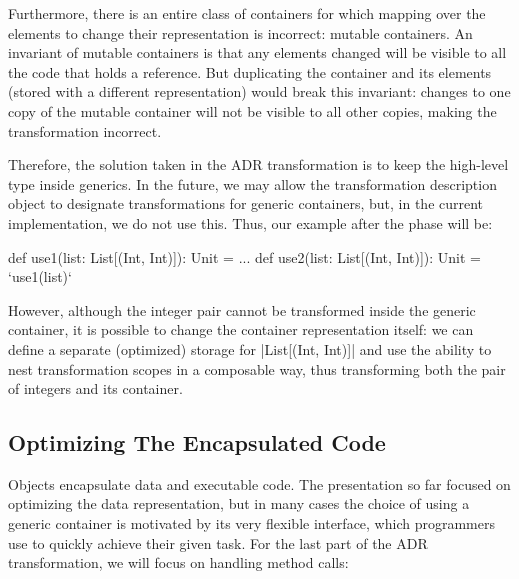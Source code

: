 Furthermore, there is an entire class of containers for which mapping over the elements to change their representation is incorrect: mutable containers. An invariant of mutable containers is that any elements changed will be visible to all the code that holds a reference. But duplicating the container and its elements (stored with a different representation) would break this invariant: changes to one copy of the mutable container will not be visible to all other copies, making the transformation incorrect.

Therefore, the solution taken in the ADR transformation is to keep the high-level type inside generics. In the future, we may allow the transformation description object to designate transformations for generic containers, but, in the current implementation, we do not use this. Thus, our example after the \commit{} phase will be:

\begin{lstlisting-nobreak}
def use1(list: List[(Int, Int)]): Unit = ...
def use2(list: List[(Int, Int)]): Unit = `use1(list)`
\end{lstlisting-nobreak}

However, although the integer pair cannot be transformed inside the generic container, it is possible to change the container representation itself: we can define a separate (optimized) storage for |List[(Int, Int)]| and use the ability to nest transformation scopes in a composable way, thus transforming both the pair of integers and its container.



\subsection{Optimizing The Encapsulated Code}
\label{sec:ildl:semantics}

Objects encapsulate data and executable code. The presentation so far focused on optimizing the data representation, but in many cases the choice of using a generic container is motivated by its very flexible interface, which programmers use to quickly achieve their given task. For the last part of the ADR transformation, we will focus on handling method calls:

